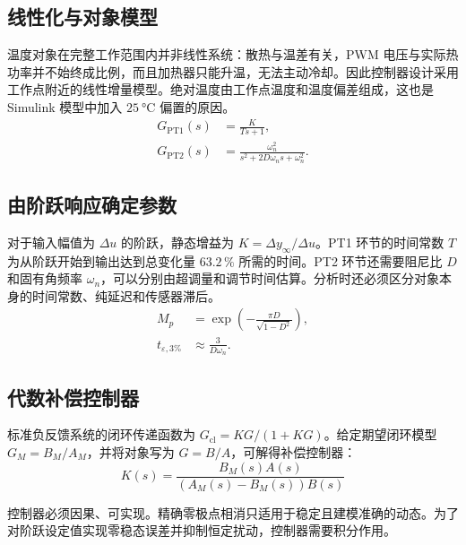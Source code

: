 \subsection{线性化与对象模型}

温度对象在完整工作范围内并非线性系统：散热与温差有关，PWM 电压与实际热功率并不始终成比例，而且加热器只能升温，无法主动冷却。因此控制器设计采用工作点附近的线性增量模型。绝对温度由工作点温度和温度偏差组成，这也是 Simulink 模型中加入 $\SI{25}{\celsius}$ 偏置的原因。
\begin{align}
  G_{\mathrm{PT1}}(s) &= \frac{K}{T s + 1}, \\
  G_{\mathrm{PT2}}(s) &= \frac{\omega_n^2}{s^2 + 2D\omega_n s + \omega_n^2}.
\end{align}

\subsection{由阶跃响应确定参数}

对于输入幅值为 $\Delta u$ 的阶跃，静态增益为 $K = \Delta y_\infty / \Delta u$。PT1 环节的时间常数 $T$ 为从阶跃开始到输出达到总变化量 $63.2\,\%$ 所需的时间。PT2 环节还需要阻尼比 $D$ 和固有角频率 $\omega_n$，可以分别由超调量和调节时间估算。分析时还必须区分对象本身的时间常数、纯延迟和传感器滞后。
\begin{align}
  M_p &= \exp\left(-\frac{\pi D}{\sqrt{1 - D^2}}\right), \\
  t_{\varepsilon,3\%} &\approx \frac{3}{D\omega_n}.
\end{align}

\subsection{代数补偿控制器}

标准负反馈系统的闭环传递函数为 $G_{\mathrm{cl}} = KG/(1 + KG)$。给定期望闭环模型 $G_M = B_M/A_M$，并将对象写为 $G = B/A$，可解得补偿控制器：
\begin{equation}
  K(s) = \frac{B_M(s) A(s)}{(A_M(s) - B_M(s)) B(s)}
\end{equation}

控制器必须因果、可实现。精确零极点相消只适用于稳定且建模准确的动态。为了对阶跃设定值实现零稳态误差并抑制恒定扰动，控制器需要积分作用。
